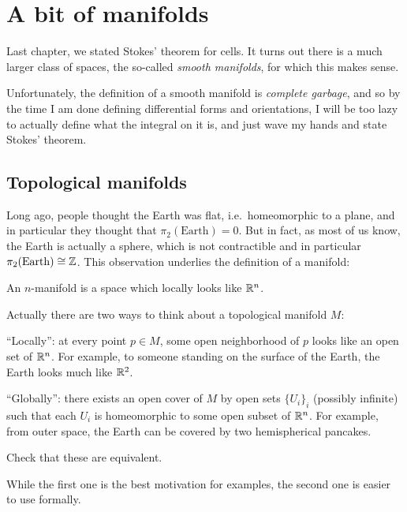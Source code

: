 \chapter{A bit of manifolds}
\label{ch:manifolds_diffgeo}
Last chapter, we stated Stokes' theorem for cells.
It turns out there is a much larger class of spaces,
the so-called \emph{smooth manifolds}, for which this makes sense.

Unfortunately, the definition of a smooth manifold is \emph{complete garbage},
and so by the time I am done defining differential forms and orientations,
I will be too lazy to actually define what the integral on it is,
and just wave my hands and state Stokes' theorem.

\section{Topological manifolds}

Long ago, people thought the Earth was flat,
i.e.\ homeomorphic to a plane, and in particular they thought that
$\pi_2(\text{Earth}) = 0$.
But in fact, as most of us know, the Earth is actually a sphere,
which is not contractible and in particular $\pi_2(\text{Earth}) \cong \mathbb Z$.
This observation underlies the definition of a manifold:
\begin{moral}
	An $n$-manifold is a space which locally looks like $\mathbb R^n$.
\end{moral}
Actually there are two ways to think about a topological manifold $M$:
\begin{itemize}
	\ii ``Locally'': at every point $p \in M$,
	some open neighborhood of $p$ looks like an open set of $\mathbb R^n$.
	For example, to someone standing on the surface of the Earth,
	the Earth looks much like $\mathbb R^2$.

	\ii ``Globally'': there exists an open cover of $M$
	by open sets $\{U_i\}_i$ (possibly infinite) such that each $U_i$
	is homeomorphic to some open subset of $\mathbb R^n$.
	For example, from outer space, the Earth can be covered
	by two hemispherical pancakes.
\end{itemize}
\begin{ques}
	Check that these are equivalent.
\end{ques}
While the first one is the best motivation for examples,
the second one is easier to use formally.

